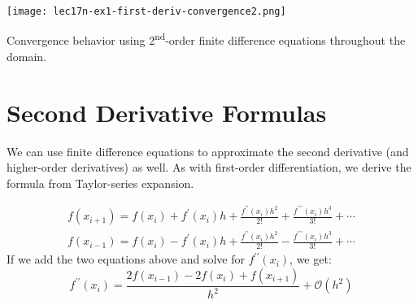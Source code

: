 \begin{marginfigure}[-3.0cm]
\texttt{[image: lec17n-ex1-first-deriv-convergence2.png]}
\caption{Convergence behavior using 2\textsuperscript{nd}-order finite difference equations throughout the domain.}
\label{fig:lec17n-ex1-first-deriv-convergence2}
\end{marginfigure}

\section{Second Derivative Formulas}

We can use finite difference equations to approximate the second derivative (and higher-order derivatives) as well.  As with first-order differentiation, we derive the formula from Taylor-series expansion.

\begin{align*}
f(x_{i+1})=f(x_i)+f^{\prime}(x_i)h+\frac{f^{\prime \prime}(x_i)h^2}{2!}+\frac{f^{\prime\prime\prime}(x_i)h^3}{3!}+ \cdots \\
f(x_{i-1})=f(x_i)-f^{\prime}(x_i)h+\frac{f^{\prime \prime}(x_i)h^2}{2!}-\frac{f^{\prime\prime\prime}(x_i)h^3}{3!}+ \cdots
\end{align*}
If we add the two equations above and solve for $f^{\prime \prime}(x_i)$, we get:
\begin{equation}
f^{\prime \prime}(x_i) = \frac{2f(x_{i-1})-2f(x_{i})+f(x_{i+1})}{h^2}+\mathcal{O}(h^2)
\end{equation}

